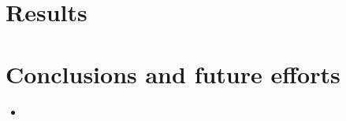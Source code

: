 \documentclass[baaa]{baaa}
\begin{document}
\section{Results}



\section{Conclusions and future efforts}
\begin{itemize}
\item 
\end{itemize}


\small

 
\end{document}
